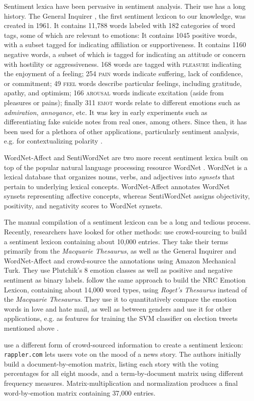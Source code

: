 Sentiment lexica have been pervasive in sentiment analysis. Their use has a long history. The General Inquirer \cite{general_inquirer}, the first sentiment lexicon to our knowledge, was created in 1961. It contains 11,788 words labeled with 182 categories of word tags, some of which are relevant to emotions: It contains 1045 positive words, with a subset tagged for indicating affiliation or supportiveness. It contains 1160 negative words, a subset of which is tagged for indicating an attitude or concern with hostility or aggressiveness. 168 words are tagged with \textsc{pleasure} indicating the enjoyment of a feeling; 254 \textsc{pain} words indicate suffering, lack of confidence, or commitment; 49 \textsc{feel} words describe particular feelings, including gratitude, apathy, and optimism; 166 \textsc{arousal} words indicate excitation (aside from pleasures or pains); finally 311 \textsc{emot} words relate to different emotions such as \textit{admiration}, \textit{annoyance}, etc. It was key in early experiments such as differentiating fake suicide notes from real ones, among others. Since then, it has been used for a plethora of other applications, particularly sentiment analysis, e.g. for contextualizing polarity \cite{general_inquirer_usage}. 

WordNet-Affect \cite{wordnet-affect} and SentiWordNet \cite{sentiwordnet} are two more recent sentiment lexica built on top of the popular natural language processing resource WordNet \cite{wordnet}. WordNet is a lexical database that organizes nouns, verbs, and adjectives into \textit{synsets} that pertain to underlying lexical concepts. WordNet-Affect annotates WordNet synsets representing affective concepts, whereas SentiWordNet assigns objectivity, positivity, and negativity scores to WordNet synsets.

The manual compilation of a sentiment lexicon can be a long and tedious process. Recently, researchers have looked for other methods: \citeauthor{nrc} use crowd-sourcing to build a sentiment lexicon containing about 10,000 entries. They take their terms primarily from the \textit{Macquarie Thesaurus}, as well as the General Inquirer and WordNet-Affect and crowd-source the annotations using Amazon Mechanical Turk. They use Plutchik's 8 emotion classes as well as positive and negative sentiment as binary labels. \citeauthor{nrc_emolex} follow the same approach to build the NRC Emotion Lexicon, containing about 14,000 word types, using \textit{Roget's Thesaurus} instead of the \textit{Macquarie Thesaurus}. They use it to quantitatively compare the emotion words in love and hate mail, as well as between genders and use it for other applications, e.g. as features for training the SVM classifier on election tweets mentioned above \citeauthor{semantic_role_labeling_tweets}.

\citeauthor{depechemood} use a different form of crowd-sourced information to create a sentiment lexicon: \texttt{rappler.com} lets users  vote on the mood of a news story. The authors initially build a document-by-emotion matrix, listing each story with the voting percentages for all eight moods, and a term-by-document matrix using different frequency measures. Matrix-multiplication and normalization produces a final word-by-emotion matrix containing 37,000 entries.
